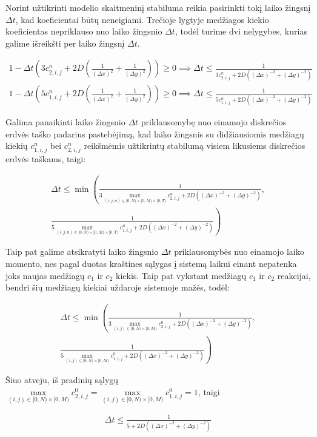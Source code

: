 Norint užtikrinti modelio skaitmeninį stabiluma reikia pasirinkti tokį laiko žingsnį $\Delta t$, kad koeficientai būtų neneigiami.
Trečioje lygtyje medžiagos kiekio koeficientas nepriklauso nuo laiko žingsnio $\Delta t$, todėl turime dvi nelygybes, kurias
galime išreikšti per laiko žingsnį $\Delta t$.

\begin{align*}
    1-\Delta t\left(3c^{n}_{2,i,j}+2D\left(\frac{1}{(\Delta x)^2}+\frac{1}{(\Delta y)^2}\right)\right)\geq 0\implies
    \Delta t\leq\frac{1}{3c^{n}_{2,i,j}+2D\left((\Delta x)^{-2}+(\Delta y)^{-2}\right)}\\
    1-\Delta t\left(5c^{n}_{1,i,j}+2D\left(\frac{1}{(\Delta x)^2}+\frac{1}{(\Delta y)^2}\right)\right)\geq 0\implies
    \Delta t\leq\frac{1}{5c^{n}_{1,i,j}+2D\left((\Delta x)^{-2}+(\Delta y)^{-2}\right)}
\end{align*}

\newpage
Galima panaikinti laiko žingsnio $\Delta t$ priklausomybę nuo einamojo diskrečios erdvės taško padarius pastebėjimą,
kad laiko žingsnis su didžiausiomis medžiagų kiekių $c^n_{1,i,j}$ bei $c^n_{2,i,j}$ reikšmėmis užtikrintų stabilumą visiem
likusiems diskrečios erdvės taškams, taigi:

\begin{align*}
    \Delta t\leq\min\left(
    \frac{1}{3\max\limits_{(i,j,n)\in[0,N)\times[0,M)\times[0,T)}c^{n}_{2,i,j}
    +2D\left((\Delta x)^{-2}+(\Delta y)^{-2}\right)},\right.\\
    \left. \frac{1}{5\max\limits_{(i,j,n)\in[0,N)\times[0,M)\times[0,T)}c^{n}_{1,i,j}
    +2D\left((\Delta x)^{-2}+(\Delta y)^{-2}\right)}
    \right)
\end{align*}

Taip pat galime atsikratyti laiko žingsnio $\Delta t$ priklausomybės nuo einamojo laiko momento, nes
pagal duotas kraštines sąlygas į sistemą laikui einant nepatenka joks naujas medžiagų $c_1$ ir $c_2$ kiekis.
Taip pat vykstant medžiagų $c_1$ ir $c_2$ reakcijai, bendri šių medžiagų kiekiai uždaroje sistemoje mažės, todėl:

\begin{align*}
    \Delta t\leq\min\left(
        \frac{1}{3\max\limits_{(i,j)\in[0,N)\times[0,M)}c^{0}_{2,i,j}
        +2D\left((\Delta x)^{-2}+(\Delta y)^{-2}\right)},\right. \\
        \left. \frac{1}{5\max\limits_{(i,j)\in[0,N)\times[0,M)}c^{0}_{1,i,j}
        +2D\left((\Delta x)^{-2}+(\Delta y)^{-2}\right)}
    \right)
\end{align*}

Šiuo atveju, iš pradinių sąlygų $\max\limits_{(i,j)\in[0,N)\times[0,M)}c^{0}_{2,i,j}=\max\limits_{(i,j)\in[0,N)\times[0,M)}c^{0}_{1,i,j}=1$, taigi

\begin{align*}
    \Delta t\leq\frac{1}{5+2D\left((\Delta x)^{-2}+(\Delta y)^{-2}\right)}
\end{align*}